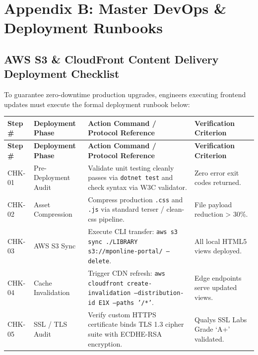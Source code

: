\documentclass[10pt,journal,compsoc]{IEEEtran}
\begin{document}
\newpage

\section{Appendix B: Master DevOps \& Deployment Runbooks}

\subsection{AWS S3 \& CloudFront Content Delivery Deployment Checklist}
To guarantee zero-downtime production upgrades, engineers executing frontend updates must execute the formal deployment runbook below:

\vspace{10pt}
\noindent
\begin{center}
\renewcommand{\arraystretch}{1.25}
\begin{longtable}{|L{1.8cm}|L{3.6cm}|L{6.2cm}|L{3.5cm}|}
\hline
{}
\textbf{\color{white}Step \#} & \textbf{\color{white}Deployment Phase} & \textbf{\color{white}Action Command / Protocol Reference} & \textbf{\color{white}Verification Criterion} \\
\hline
\endfirsthead
\hline
{}
\textbf{\color{white}Step \#} & \textbf{\color{white}Deployment Phase} & \textbf{\color{white}Action Command / Protocol Reference} & \textbf{\color{white}Verification Criterion} \\
\hline
\endhead
CHK-01 & Pre-Deployment Audit & Validate unit testing cleanly passes via \texttt{dotnet test} and check syntax via W3C validator. & Zero error exit codes returned. \\
\hline
{}
CHK-02 & Asset Compression & Compress production \texttt{.css} and \texttt{.js} via standard terser / clean-css pipeline. & File payload reduction > 30\%. \\
\hline
CHK-03 & AWS S3 Sync & Execute CLI transfer: \texttt{aws s3 sync ./LIBRARY s3://mponline-portal/ --delete}. & All local HTML5 views deployed. \\
\hline
{}
CHK-04 & Cache Invalidation & Trigger CDN refresh: \texttt{aws cloudfront create-invalidation --distribution-id E1X --paths '/*'}. & Edge endpoints serve updated views. \\
\hline
CHK-05 & SSL / TLS Audit & Verify custom HTTPS certificate binds TLS 1.3 cipher suite with ECDHE-RSA encryption. & Qualys SSL Labs Grade `A+' validated. \\
\hline
\end{longtable}
\end{center}
\end{document}
